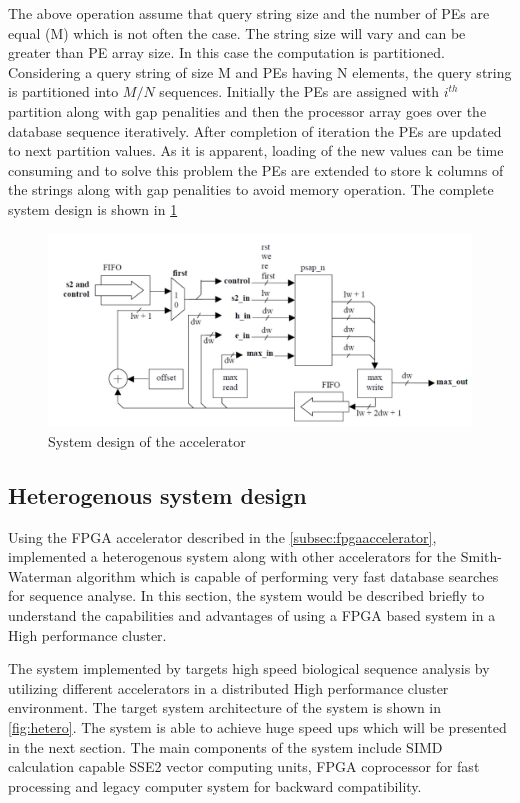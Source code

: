\documentclass[12pt,twoside]{article}
\begin{document}
The above operation assume that query string size and the number of PEs are equal (M) which is not often the case. The string size will vary and 
can be greater than PE array size. In this case the computation is partitioned. Considering a query string of size M and PEs having N elements,
the query string is partitioned into $ M/N $ sequences. Initially the PEs are assigned with $ i^{th} $ partition along with gap penalities and
then the processor array goes over the database sequence iteratively. After completion of iteration the PEs are updated to next partition values.
As it is apparent, loading of the new values can be time consuming and to solve this problem the PEs are extended to store k columns of the strings along
with gap penalities to avoid memory operation. The complete system design is shown in \cref{fig:systemdesign} 

\begin{figure}[h]%
    \centering
    \includegraphics[width=1.0\textwidth]{fig/systemdesign}
    \caption{System design of the accelerator \cite[Figure 4]{oliver_hyper_2005}}
    \label{fig:systemdesign}
\end{figure}

\subsection{Heterogenous system design}

Using the FPGA accelerator described in the \cref{subsec:fpgaaccelerator}, \textcite{meng_high-performance_2010} implemented a heterogenous system
along with other accelerators for the Smith-Waterman algorithm which is capable of performing very fast database searches for sequence analyse.
In this section, the system would be described briefly to understand the capabilities and advantages of using a FPGA based system in a 
High performance cluster.

The system implemented by \textcite{meng_high-performance_2010} targets high speed biological sequence analysis by utilizing different accelerators
in a distributed High performance cluster environment. The target system architecture of the system is shown in \cref{fig:hetero}. The system is able
to achieve huge speed ups which will be presented in the next section. The main components of the system include SIMD calculation capable
SSE2 vector computing units, FPGA coprocessor for fast processing and legacy computer system for backward compatibility.
\end{document}
